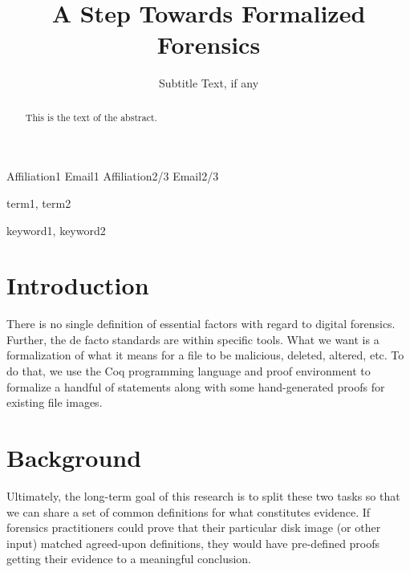 \documentclass[nocopyrightspace]{sigplanconf}
\begin{document}
\lstset{language=coq, basicstyle=\ttfamily\scriptsize, columns=fixed,
breaklines=true}

\setlength{\pdfpageheight}{\paperheight}
\setlength{\pdfpagewidth}{\paperwidth}



\title{A Step Towards Formalized Forensics}
\subtitle{Subtitle Text, if any}

           {Affiliation1}
           {Email1}
           {Affiliation2/3}
           {Email2/3}

\maketitle

\begin{abstract}
This is the text of the abstract.
\end{abstract}


\terms
term1, term2

\keywords
keyword1, keyword2

\section{Introduction}

There is no single definition of essential factors with regard to digital
forensics. Further, the de facto standards are within specific tools. What we
want is a formalization of what it means for a file to be malicious, deleted,
altered, etc. To do that, we use the Coq programming language and proof
environment to formalize a handful of statements along with some
hand-generated proofs for existing file images.

\section{Background}
Ultimately, the long-term goal of this research is to split these two tasks so
that we can share a set of common definitions for what constitutes evidence.
If forensics practitioners could prove that their particular disk image (or
other input) matched agreed-upon definitions, they would have pre-defined
proofs getting their evidence to a meaningful conclusion.
\end{document}
